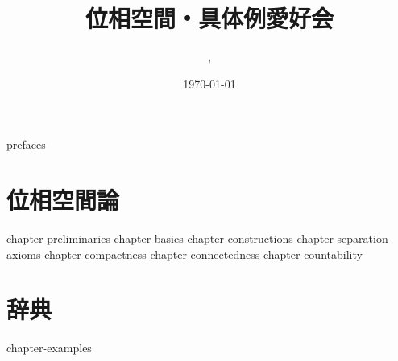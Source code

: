 \documentclass[uplatex, dvipdfmx, a4paper, 12pt]{jsbook}
\begin{document}
\title{位相空間・具体例愛好会}
\author{\ykyki, \chen}
\date{\today}
\maketitle

\makeatletter
\makeatother

{prefaces}
\tableofcontents

\part{位相空間論}
\label{part:theories}

\setcounter{chapter}{-1}
{chapter-preliminaries}
{chapter-basics}
{chapter-constructions}
{chapter-separation-axioms}
{chapter-compactness}
{chapter-connectedness}
{chapter-countability}

\part{辞典}
\label{part:dictionary}
{chapter-examples}

\printindex

\printbibliography[title=参考文献]
\end{document}
